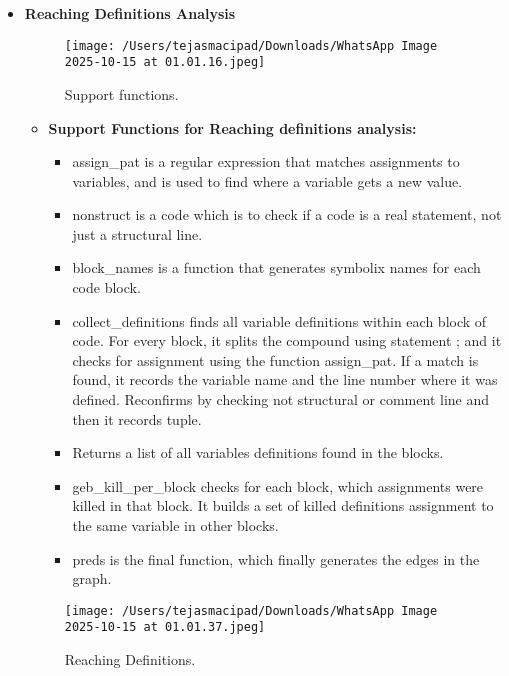 \documentclass[12pt, a4paper]{report}
\begin{document}
\begin{itemize}
    \item \textbf{Reaching Definitions Analysis}
        \begin{figure}[h!]
            \centering
            \texttt{[image: /Users/tejasmacipad/Downloads/WhatsApp Image 2025-10-15 at 01.01.16.jpeg]}
            \caption{Support functions.}
            \label{fig:diff-example-56}
        \end{figure}

        \begin{itemize}
            \item \textbf{Support Functions for Reaching definitions analysis:}
            \begin{itemize}
                \item assign\_pat is a regular expression that matches assignments to variables, and is used to find where a variable gets a new value.
                \item nonstruct is a code which is to check if a code is a real statement, not just a structural line.
                \item block\_names is a function that generates symbolix names for each code block.
                \item collect\_definitions finds all variable definitions within each block of code. For every block, it splits the compound using statement ; and it checks for assignment using the function assign\_pat. If a match is found, it records the variable name and the line number where it was defined. Reconfirms by checking not structural or comment line and then it records tuple.
                \item Returns a list of all variables definitions found in the blocks.
                \item geb\_kill\_per\_block checks for each block, which assignments were killed in that block. It builds a set of killed definitions assignment to the same variable in other blocks.
                \item preds is the final function, which finally generates the edges in the graph.
            \end{itemize}
        \end{itemize}
    
        \begin{figure}[h!]
            \centering
            \texttt{[image: /Users/tejasmacipad/Downloads/WhatsApp Image 2025-10-15 at 01.01.37.jpeg]}
            \caption{Reaching Definitions.}
            \label{fig:diff-example-57}
        \end{figure}


\end{itemize}
\end{document}
